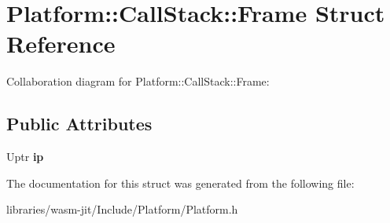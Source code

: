 \hypertarget{struct_platform_1_1_call_stack_1_1_frame}{}\section{Platform\+:\+:Call\+Stack\+:\+:Frame Struct Reference}
\label{struct_platform_1_1_call_stack_1_1_frame}


Collaboration diagram for Platform\+:\+:Call\+Stack\+:\+:Frame\+:
\subsection*{Public Attributes}
\begin{DoxyCompactItemize}
\item 
\mbox{\label{struct_platform_1_1_call_stack_1_1_frame_ab9f8281321f56cb3baacfb935a2d8ed9}} 
Uptr {\bfseries ip}
\end{DoxyCompactItemize}


The documentation for this struct was generated from the following file\+:\begin{DoxyCompactItemize}
\item 
libraries/wasm-\/jit/\+Include/\+Platform/Platform.\+h\end{DoxyCompactItemize}
